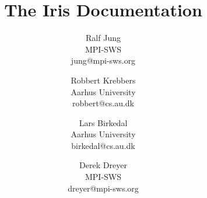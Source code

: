 \documentclass[10pt]{article}
\begin{document}
\title{\bfseries The Iris Documentation}

\author{%
 Ralf Jung \\ MPI-SWS \\ jung@mpi-sws.org \and
 Robbert Krebbers \\ Aarhus University \\ robbert@cs.au.dk \and
 Lars Birkedal \\ Aarhus University \\ birkedal@cs.au.dk \and
 Derek Dreyer \\ MPI-SWS \\ dreyer@mpi-sws.org}

\maketitle

\thispagestyle{empty}

\tableofcontents

\clearpage\begingroup

\endgroup\clearpage\begingroup
%
%
%
%
\printbibliography
\end{document}
